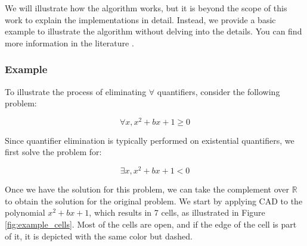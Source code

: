 We will illustrate how the algorithm works, but it is beyond the scope of this work to explain the implementations in detail.
Instead, we provide a basic example to illustrate the algorithm without delving into the details.
You can find more information in the literature \cite{caviness_quantifier_1998, england_cylindrical_2020}.

\subsubsection{Example}
To illustrate the process of eliminating $\forall$ quantifiers, consider the following problem:

\[ \forall x, x^2 + bx + 1 \geq 0
\]

Since quantifier elimination is typically performed on existential quantifiers, we first solve the problem for:

\[ \exists x, x^2 + bx + 1 < 0 \]

Once we have the solution for this problem, we can take the complement over
$\mathbb{R}$ to obtain the solution for the original problem.
We start by applying CAD to the polynomial $x^2 + bx + 1$, which results in 7 cells, as illustrated in Figure \ref{fig:example_cells}.
Most of the cells are open, and if the edge of the cell is part of it, it is depicted with the same color but dashed.

